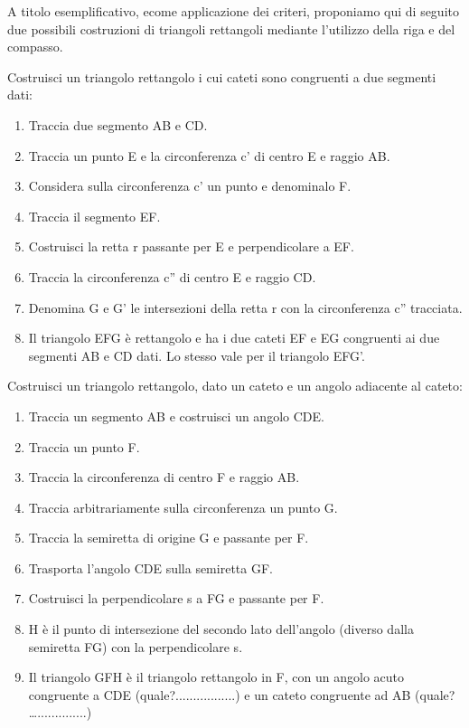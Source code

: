 A titolo esemplificativo, ecome applicazione dei criteri, proponiamo qui di 
seguito  due possibili costruzioni di triangoli rettangoli mediante l'utilizzo 
della riga e del compasso.

\begin{procedura}
  Costruisci un triangolo rettangolo i cui cateti sono congruenti a due 
segmenti dati:
  \begin{enumerate} [nosep]
    \item 
    Traccia due segmento AB e CD.
    \item 
    Traccia un punto E e la circonferenza c' di centro E e raggio AB.
    \item 
    Considera sulla circonferenza c' un punto e denominalo F.
    \item 
    Traccia il segmento EF.
    \item 
    Costruisci la retta r passante per E e perpendicolare a EF.
    \item 
    Traccia la circonferenza c'' di centro E e raggio CD.
    \item 
    Denomina G e G' le intersezioni della retta r con la circonferenza c'' 
tracciata.
    \item 
    Il triangolo EFG è rettangolo e ha i due cateti EF e EG congruenti ai due 
segmenti AB e CD dati. Lo stesso vale per il triangolo EFG'.
  \end{enumerate}
\end{procedura}

\begin{procedura}
  Costruisci un triangolo rettangolo, dato un cateto e un angolo adiacente al 
cateto:
  \begin{enumerate} [nosep]
    \item 
    Traccia un segmento AB e costruisci un angolo CDE.
    \item 
    Traccia un punto F.
    \item 
    Traccia la circonferenza di centro F e raggio AB.
    \item 
    Traccia arbitrariamente sulla circonferenza un punto G.
    \item 
    Traccia la semiretta di origine G e passante per F.
    \item 
    Trasporta l'angolo CDE sulla semiretta GF.
    \item 
    Costruisci la perpendicolare s a FG e passante per F.
    \item 
    H è il punto di intersezione del secondo lato dell'angolo (diverso dalla 
semiretta FG) con la perpendicolare s.
    \item 
    Il triangolo GFH è il triangolo rettangolo in F, con un angolo acuto 
congruente a CDE (quale?.................) e un cateto congruente ad AB (quale? 
…..............)
  \end{enumerate}
\end{procedura}

